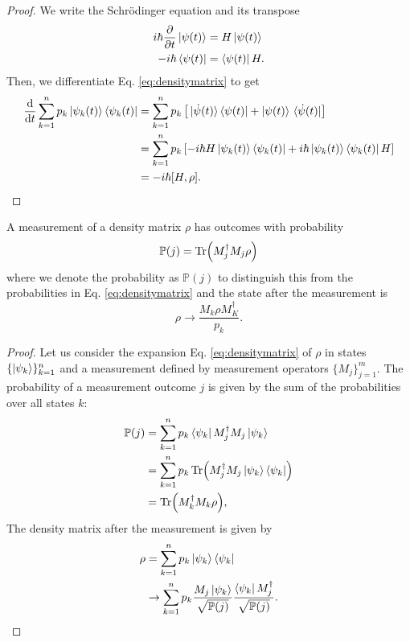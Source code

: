 \documentclass[twoside,symmetric, openany, 12pt]{./tuftebook}
\theoremstyle{definition}
\theoremstyle{definition}
\theoremstyle{definition}
\begin{document}
\begin{proof}
	We write the Schr\"{o}dinger equation and its transpose
	\begin{align*}
		i\hbar \pdv{t}\ket{\psi(t)}&=H \ket{\psi(t)}  \\
		-i\hbar \bra{\psi(t)} &= \bra{\psi(t)} H.
	\end{align*}
	Then, we differentiate Eq. \eqref{eq:densitymatrix} to get
	\begin{align*}
		\dv{t} \sum_{k=1}^{n} p_k \ket{\psi_k(t)}\bra{\psi_k(t)} &= \sum_{k=1}^{n} p_k \left[ \ket*{\dot{\psi}(t)} \bra{\psi(t)} + \ket{\psi(t)}\bra*{\dot{\psi}(t)} \right]  \\
									 &= \sum_{k=1}^{n} p_k \left[ -i \hbar H \ket{\psi_k(t)}\bra{\psi_k(t)} + i \hbar \ket{\psi_k(t)} \bra{\psi_k(t)} H\right]  \\
									 &= -i \hbar[H, \rho].\qedhere
	\end{align*}
\end{proof}
\begin{Theorem}
	A measurement of a density matrix $\rho$ has outcomes with probability
	\[
		\mathbb{P}(j) = \Tr (M_j^\dagger M_j \rho)
\]
where we denote the probability as $\mathbb{P}(j)$ to distinguish this from the probabilities in Eq. \eqref{eq:densitymatrix} and the state after the measurement is
\[
\rho \to \frac{M_k \rho M_K^\dagger}{p_k}
.\] 
\end{Theorem}
\begin{proof}
	Let us consider the expansion Eq. \eqref{eq:densitymatrix} of $\rho$ in states $\{\ket{\psi_k}\}_{k=1}^n$ and a measurement defined by measurement operators $\{M_j\}_{j=1}^m$. The probability of a measurement outcome $j$ is given by the sum of the probabilities over all states $k$:
	\begin{align*}
		\mathbb{P}(j) &= \sum_{k=1}^n p_k \bra{\psi_k}M_j^\dagger M_j \ket{\psi_k} \\ 
			      &= \sum_{k=1}^n p_k\Tr(M_j^\dagger M_j \ket{\psi_k}\bra{\psi_k}) \\
			      &= \Tr (M_k^\dagger M_k \rho),
	\end{align*}
	The density matrix after the measurement is given by
	\begin{align*}
		\rho &= \sum_{k=1}^{n} p_k \ket{\psi_k}\bra{\psi_k}\\
		     &\to \sum_{k=1}^{n} p_k \frac{M_j \ket{\psi_k}}{\sqrt{\mathbb{P}(j)} } \frac{\bra{\psi_k} M_j^\dagger}{\sqrt{\mathbb{P}(j)} }.\qedhere
	\end{align*}
\end{proof}
\end{document}
